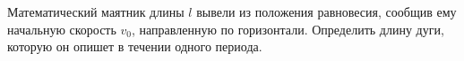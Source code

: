 Математический маятник длины $l$ вывели из положения равновесия,
сообщив ему начальную скорость $v_{0}$, направленную по горизонтали.
Определить длину дуги, которую он опишет в течении одного периода.
